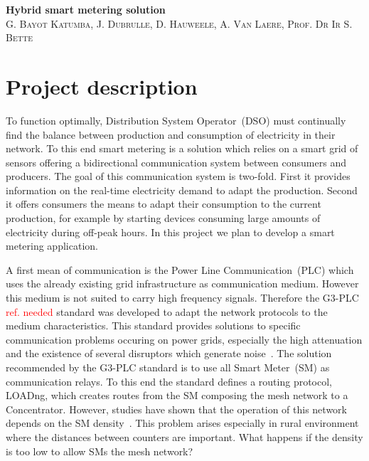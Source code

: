 \documentclass[a4paper,10pt]{article}
\newcommand{\FIXME}[1]{\textcolor{red}{\framebox{FIXME:} #1}}
\begin{document}

\begin{center}
  \huge\textbf{Hybrid smart metering solution}\\
  \vspace{0.5em}
  \small\textsc{G. Bayot Katumba, J. Dubrulle, D. Hauweele, A. Van Laere, Prof. Dr Ir S. Bette}
\end{center}

\section{Project description}

To function optimally, Distribution System Operator~(DSO)
must continually find the balance between production and
consumption of electricity in their network. To this end
smart metering is a solution which relies on a smart grid of
sensors offering a bidirectional communication system
between consumers and producers. The goal of this
communication system is two-fold. First it provides
information on the real-time electricity demand to adapt the
production. Second it offers consumers the means to adapt
their consumption to the current production, for example by
starting devices consuming large amounts of electricity
during off-peak hours. In this project we plan to develop a
smart metering application.

A first mean of communication is the Power Line
Communication~(PLC) which uses the already existing grid
infrastructure as communication medium. However this medium
is not suited to carry high frequency signals. Therefore the
G3-PLC\FIXME{ref. needed} standard was developed to adapt
the network protocols to the medium characteristics. This
standard provides solutions to specific communication
problems occuring on power grids, especially the high
attenuation and the existence of several disruptors which
generate noise~\cite{itu_sim2016}. The solution recommended
by the G3-PLC standard is to use all Smart Meter~(SM) as
communication relays. To this end the standard defines a
routing protocol, LOADng, which creates routes from the SM
composing the mesh network to a Concentrator. However,
studies have shown that the operation of this network
depends on the SM density~\cite{g3plc_density2015}. This
problem arises especially in rural environment where the
distances between counters are important. What happens if
the density is too low to allow SMs the mesh network?
\end{document}
